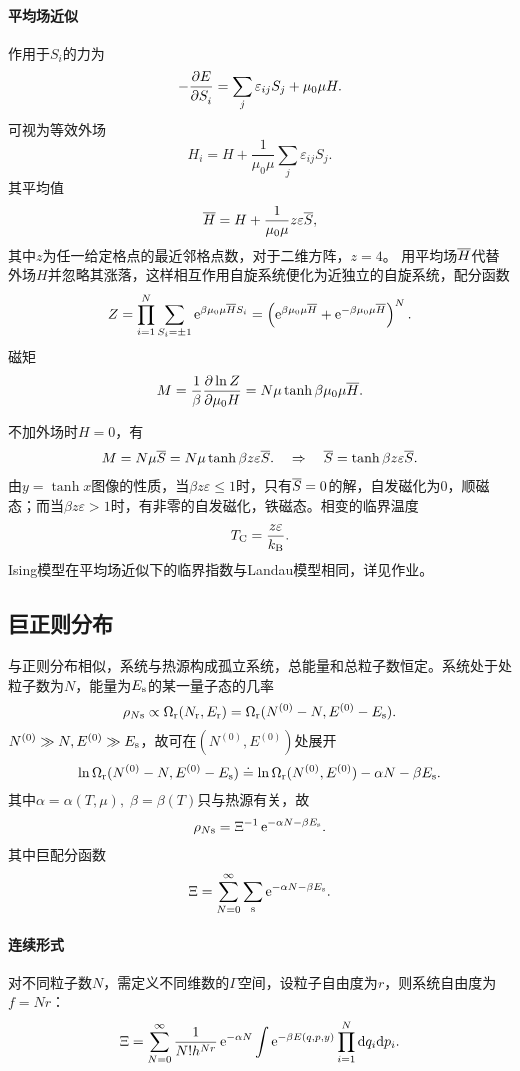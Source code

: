 \paragraph*{平均场近似}作用于$S_i$的力为 
\[
	-\frac{\partial^{\;\!\!}E}{\partial S_i^{\;\!\!}}=\sum_j\varepsilon_{ij}S_j+\mu_0\mu H.
\]
可视为等效外场
\[
	H_i=H+\frac1{\mu_0\mu}\sum_j\varepsilon_{ij}S_j.
\]
其平均值
\[
	\overline H=H+\frac1{\mu_0\mu}z\varepsilon\overline S,
\]
其中$z$为任一给定格点的最近邻格点数，对于二维方阵，$z=4$。
\clearpage
用平均场$\overline H$代替外场$H$并忽略其涨落，这样相互作用自旋系统便化为近独立的自旋系统，配分函数
\[
	Z=\prod_{i=1}^N\sum_{S_i=\pm 1}\mathop{}\!\mathrm{e}^{\beta\mu_0\mu\overline H S_i}=\left(\mathop{}\!\mathrm{e}^{\beta\mu_0\mu\overline H}+\mathop{}\!\mathrm{e}^{-\beta\mu_0\mu\overline H}\right)^N.
\]
磁矩
\begin{align}
	M=\frac1\beta\frac{\partial^{\;\!\!}\ln Z}{\partial \mu_0 H^{\;\!\!}}=N\mu\tanh\beta\mu_0\mu\overline H.
\end{align}

不加外场时$H=0$，有
\begin{align}
	M=N\mu\overline S=N\mu\tanh\beta z\varepsilon\overline S.\quad\Rightarrow\quad\overline S=\tanh\beta z\varepsilon\overline S.
\end{align}
由$y=\tanh x$图像的性质，当$\beta z\varepsilon\leqslant 1$时，只有$\overline S=0$的解，自发磁化为0，顺磁态；而当$\beta z\varepsilon>1$时，有非零的自发磁化，铁磁态。相变的临界温度
\begin{align}
	T_\mathrm C=\frac{z\varepsilon}{k_{\mathrm B}}.
\end{align}
Ising模型在平均场近似下的临界指数与Landau模型相同，详见作业。
\subsection{巨正则分布}

与正则分布相似，系统与热源构成孤立系统，总能量和总粒子数恒定。系统处于处粒子数为$N$，能量为$E_\mathrm s$的某一量子态的几率
\[
	\rho_{N\mathrm s}\propto\Omega_\mathrm r(N_\mathrm r,E_\mathrm r)=\Omega_\mathrm r(N^{(0)}-N,E^{(0)}-E_\mathrm s).
\]
$N^{(0)}\gg N,E^{(0)}\gg E_\mathrm s$，故可在$(N^{(0)},E^{(0)})$处展开
\[
	\ln\Omega_\mathrm r(N^{(0)}-N,E^{(0)}-E_\mathrm s)\doteq\ln\Omega_\mathrm r(N^{(0)},E^{(0)})-\alpha N-\beta E_\mathrm s.
\]
其中$\alpha=\alpha(T,\mu),\;\beta=\beta(T)$只与热源有关，故
\begin{align}
	\rho_{N\mathrm s}=\Xi^{-1}\mathop{}\!\mathrm{e}^{-\alpha N-\beta E_\mathrm s}.
\end{align}
其中巨配分函数
\begin{align}
	\Xi=\sum_{N=0}^\infty\sum_\mathrm s\mathop{}\!\mathrm{e}^{-\alpha N-\beta E_\mathrm s}.
\end{align}
\paragraph*{连续形式}对不同粒子数$N$，需定义不同维数的$\Gamma$空间，设粒子自由度为$r$，则系统自由度为$f=Nr$：
\begin{align}
	\Xi=\sum_{N=0}^\infty\frac1{N!h^{Nr}}\mathop{}\!\mathrm{e}^{-\alpha N}\int\mathop{}\!\mathrm{e}^{-\beta E(q,p,y)}\prod_{i=1}^N\mathop{}\!\mathrm{d} q_i\mathrm{d} p_i.
\end{align}
